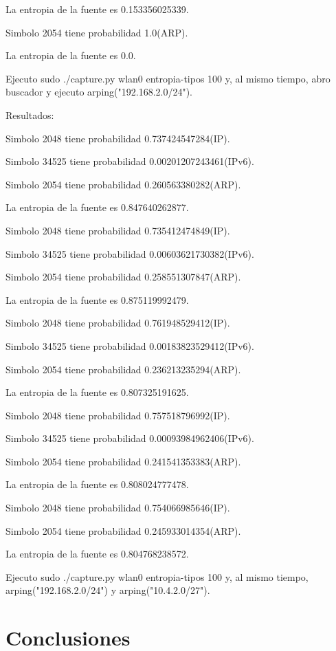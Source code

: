 \documentclass[a4paper]{article}
\begin{document}
La entropia de la fuente es 0.153356025339.

Simbolo 2054 tiene probabilidad 1.0(ARP).

La entropia de la fuente es 0.0.

Ejecuto  sudo ./capture.py wlan0 entropia-tipos 100 y, al mismo tiempo, abro buscador y ejecuto arping("192.168.2.0/24").

Resultados:

Simbolo 2048 tiene probabilidad 0.737424547284(IP).

Simbolo 34525 tiene probabilidad 0.00201207243461(IPv6).

Simbolo 2054 tiene probabilidad 0.260563380282(ARP).

La entropia de la fuente es 0.847640262877.

Simbolo 2048 tiene probabilidad 0.735412474849(IP).

Simbolo 34525 tiene probabilidad 0.00603621730382(IPv6).

Simbolo 2054 tiene probabilidad 0.258551307847(ARP).

La entropia de la fuente es 0.875119992479.

Simbolo 2048 tiene probabilidad 0.761948529412(IP).

Simbolo 34525 tiene probabilidad 0.00183823529412(IPv6).

Simbolo 2054 tiene probabilidad 0.236213235294(ARP).

La entropia de la fuente es 0.807325191625.

Simbolo 2048 tiene probabilidad 0.757518796992(IP).

Simbolo 34525 tiene probabilidad 0.00093984962406(IPv6).

Simbolo 2054 tiene probabilidad 0.241541353383(ARP).

La entropia de la fuente es 0.808024777478.

Simbolo 2048 tiene probabilidad 0.754066985646(IP).

Simbolo 2054 tiene probabilidad 0.245933014354(ARP).

La entropia de la fuente es 0.804768238572.


Ejecuto  sudo ./capture.py wlan0 entropia-tipos 100 y, al mismo tiempo, arping("192.168.2.0/24") y arping("10.4.2.0/27").

\newpage
\section{Conclusiones}


% 
% 
%
% 
\end{document}
